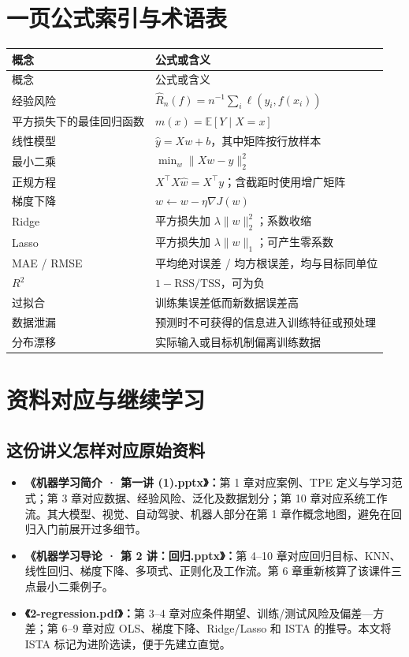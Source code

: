 \documentclass[UTF8,11pt,oneside]{ctexbook}
\newcommand{\E}{\mathbb{E}}
\begin{document}
\chapter{一页公式索引与术语表}
\begin{center}\begin{longtable}{p{4cm}p{9.6cm}}\toprule
概念&公式或含义\\\midrule\endfirsthead\toprule 概念&公式或含义\\\midrule\endhead
经验风险&$\widehat R_n(f)=n^{-1}\sum_i\ell(y_i,f(x_i))$\\
平方损失下的最佳回归函数&$m(x)=\E[Y\mid X=x]$\\
线性模型&$\hat y=Xw+b$，其中矩阵按行放样本\\
最小二乘&$\min_w\|Xw-y\|_2^2$\\
正规方程&$X^\top X\hat w=X^\top y$；含截距时使用增广矩阵\\
梯度下降&$w\leftarrow w-\eta\nabla J(w)$\\
Ridge&平方损失加 $\lambda\|w\|_2^2$；系数收缩\\
Lasso&平方损失加 $\lambda\|w\|_1$；可产生零系数\\
MAE / RMSE&平均绝对误差 / 均方根误差，均与目标同单位\\
$R^2$&$1-\mathrm{RSS}/\mathrm{TSS}$，可为负\\
过拟合&训练集误差低而新数据误差高\\
数据泄漏&预测时不可获得的信息进入训练特征或预处理\\
分布漂移&实际输入或目标机制偏离训练数据\\
\bottomrule\end{longtable}\end{center}

\chapter{资料对应与继续学习}
\section{这份讲义怎样对应原始资料}
\begin{itemize}
\item \textbf{《机器学习简介 · 第一讲 (1).pptx》：}第 1 章对应案例、TPE 定义与学习范式；第 3 章对应数据、经验风险、泛化及数据划分；第 10 章对应系统工作流。其大模型、视觉、自动驾驶、机器人部分在第 1 章作概念地图，避免在回归入门前展开过多细节。
\item \textbf{《机器学习导论 · 第 2 讲：回归.pptx》：}第 4--10 章对应回归目标、KNN、线性回归、梯度下降、多项式、正则化及工作流。第 6 章重新核算了该课件三点最小二乘例子。
\item \textbf{《2-regression.pdf》：}第 3--4 章对应条件期望、训练/测试风险及偏差—方差；第 6--9 章对应 OLS、梯度下降、Ridge/Lasso 和 ISTA 的推导。本文将 ISTA 标记为进阶选读，便于先建立直觉。
\end{itemize}
\end{document}
